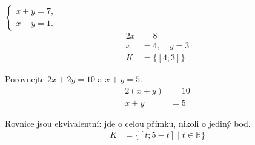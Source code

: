 \documentclass[11pt,a4paper]{article}
\begin{document}
\begin{zadaniReseniBox}[title={Samostatná práce 3}]
$\begin{cases}x+y=7,\\x-y=1.\end{cases}$
\tcblower
\[
\begin{aligned}
2x&=8 \\
 x&=4,\quad y=3 \\[2mm]
K &= \{[4;3]\}
\end{aligned}
\]
\end{zadaniReseniBox}
\begin{zadaniReseniBox}[title={Samostatná práce 4}]
Porovnejte $2x+2y=10$ a $x+y=5$.
\tcblower
\[
\begin{aligned}
2(x+y)&=10 \\
 x+y&=5
\end{aligned}
\]

Rovnice jsou ekvivalentní: jde o celou přímku, nikoli o jediný bod.
\[
\begin{aligned}
K &= \{[t;5-t]\mid t\in\mathbb R\}
\end{aligned}
\]
\end{zadaniReseniBox}
\end{document}
